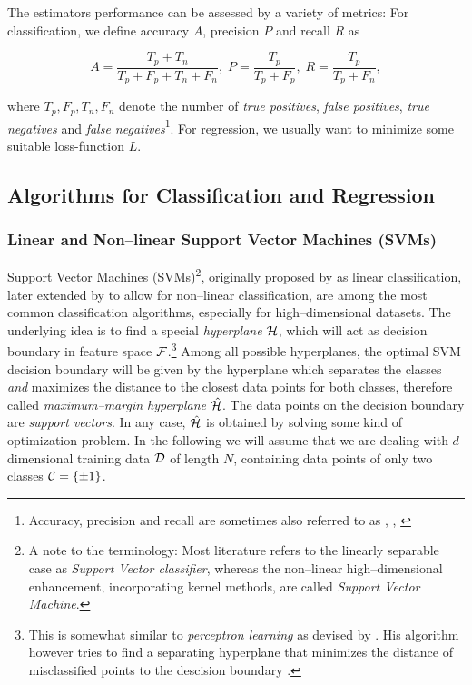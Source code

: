 The estimators performance can be assessed by a variety of metrics: For classification, we define accuracy $A$, precision $P$ and recall $R$ as

\begin{equation}
A = \frac{T_p + T_n}{T_p + F_p + T_n + F_n}, \; P = \frac{T_p}{T_p + F_p}, \; R = \frac{T_p}{T_p + F_n},
\end{equation}

where $T_p, F_p, T_n, F_n$ denote the number of \emph{true positives}, \emph{false positives}, \emph{true negatives} and \emph{false negatives}\todo{}\footnote{Accuracy, precision and recall are sometimes also referred to as \emph{}, \emph{}, \emph{}}. For regression, we usually want to minimize some suitable loss-function $L$.

\subsection{Algorithms for Classification and Regression}
\subsubsection{Linear and Non--linear Support Vector Machines (SVMs)}

Support Vector Machines (SVMs)\footnote{A note to the terminology: Most literature refers to the linearly separable case as \emph{Support Vector classifier}, whereas the non--linear high--dimensional enhancement, incorporating kernel methods, are called \emph{Support Vector Machine}.}, originally proposed by \citet{vapnik1963} as linear classification, later extended by \citet{cortes1995} to allow for non--linear classification, are among the most common classification algorithms, especially for high--dimensional datasets. The underlying idea is to find a special \emph{hyperplane} $\mathcal{H}$, which will act as decision boundary in feature space $\mathcal{F}$.\footnote{This is somewhat similar to \emph{perceptron learning} as devised by \citet{rosenblatt1958}. His algorithm however tries to find a separating hyperplane that minimizes the distance of misclassified points to the descision boundary \citep{hastie2001}.} Among all possible hyperplanes, the optimal SVM decision boundary will be given by the hyperplane which separates the classes \emph{and} maximizes the distance to the closest data points for both classes, therefore called \emph{maximum--margin hyperplane} $\hat {\mathcal{H}}$. The data points on the decision boundary are \emph{support vectors}. In any case, $\hat {\mathcal{H}}$ is obtained by solving some kind of optimization problem. In the following we will assume that we are dealing with $d$-dimensional training data $\mathcal{D}$ of length $N$, containing data points of only two classes $\mathcal{C} = \{ \pm 1 \}$. \\

